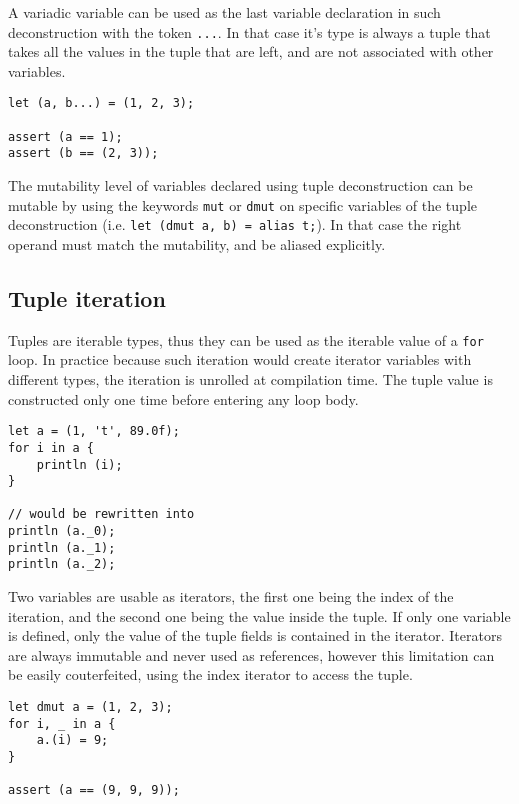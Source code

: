 A variadic variable can be used as the last variable declaration in such
deconstruction with the token \texttt{...}. In that case it's type is always a
tuple that takes all the values in the tuple that are left, and are not
associated with other variables.

\begin{lstlisting}[style=coloredverbatim]
let (a, b...) = (1, 2, 3);

assert (a == 1);
assert (b == (2, 3));
\end{lstlisting}

The mutability level of variables declared using tuple deconstruction can be
mutable by using the keywords \texttt{mut} or \texttt{dmut} on specific
variables of the tuple deconstruction (i.e. \texttt{let (dmut a, b) = alias
  t;}). In that case the right operand must match the mutability, and be aliased
explicitly.

\subsection {Tuple iteration}

Tuples are iterable types, thus they can be used as the iterable value of a
\texttt{for} loop. In practice because such iteration would create iterator
variables with different types, the iteration is unrolled at compilation time.
The tuple value is constructed only one time before entering any loop body.

\begin{lstlisting}[style=coloredverbatim]
let a = (1, 't', 89.0f);
for i in a {
    println (i);
}

// would be rewritten into
println (a._0);
println (a._1);
println (a._2);
\end{lstlisting}

Two variables are usable as iterators, the first one being the index of the
iteration, and the second one being the value inside the tuple. If only one
variable is defined, only the value of the tuple fields is contained in the
iterator. Iterators are always immutable and never used as references, however
this limitation can be easily couterfeited, using the index iterator to access
the tuple.

\begin{lstlisting}[style=coloredverbatim]
let dmut a = (1, 2, 3);
for i, _ in a {
    a.(i) = 9;
}

assert (a == (9, 9, 9));
\end{lstlisting}

